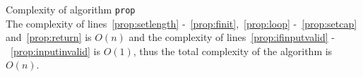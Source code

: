 \begin{sepproof}{Complexity of algorithm \texttt{prop}} \ \\
   The complexity of lines~\ref{prop:setlength} -~\ref{prop:finit},~\ref{prop:loop} -~\ref{prop:setcap} and~\ref{prop:return}
   is $O\left(n\right)$ and the complexity of lines~\ref{prop:ifinputvalid} -~\ref{prop:inputinvalid} is $O\left(1\right)$,
   thus the total complexity of the algorithm is $O\left(n\right)$.
\end{sepproof}
